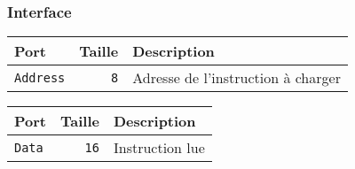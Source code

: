 \subsubsection{Interface}


\begin{tabular}{|l|r|l|}
\hline
\textbf{Port}		& \textbf{Taille} & \textbf{Description}\\
\hline

\texttt{Address}	& \texttt{8} & Adresse de l'instruction à charger\\

\hline
\end{tabular}


\begin{tabular}{|l|r|l|}
\hline 
\textbf{Port} & \textbf{Taille} & \textbf{Description}\\
\hline 

\texttt{Data}		& \texttt{16} & Instruction lue\\

\hline
\end{tabular}




